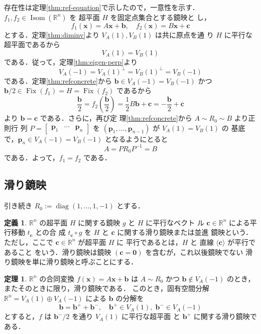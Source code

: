 \documentclass[11pt, uplatex, dvipdfmx, titlepage]{jsarticle}
\makeatletter
\DeclareMathOperator{\Isom}{Isom}
\DeclareMathOperator{\Fix}{Fix}
\DeclareMathOperator{\diag}{diag}
\renewenvironment{proof}[1][\proofname]{\par
  \pushQED{\qed}%
  \normalfont \topsep6\p@\@plus6\p@\relax
  \trivlist
  \item[\hskip\labelsep
         \bfseries
    {#1}]\ignorespaces
}{%
  \popQED\endtrivlist\@endpefalse
}
\theoremstyle{definition}
\newtheorem{theorem}{定理}[section]
\newtheorem*{definition}{定義}
\renewcommand{\proofname}{\textbf{証明}}
\makeatother
\begin{document}
\begin{proof}
  
  存在性は定理\ref{thm:ref-equation}で示したので，一意性を示す．$f_1,
  f_2 \in \Isom(\mathbb{R}^n)$ を 超平面 $H$ を固定点集合とする鏡映と
  し，
  \[
    f_1(\bm{x}) = A\bm{x} + \bm{b}, \quad f_2(\bm{x}) = B\bm{x} + \bm{c}
  \]
  とする．定理\ref{thm:diminv}より $V_A(1), V_B(1)$ は共に原点を通
  り $H$ に平行な超平面であるから
  \[
    V_A(1) = V_B(1)
  \]
  である．従って，定理\ref{thm:eigen-perp}より
  \[
    V_A(-1) = V_A(1)^{\perp} = V_B(1)^{\perp} = V_B(-1)
  \]
  である．定理\ref{thm:refconcrete}から $\bm{b} \in
  V_A(-1) = V_B(-1)$ かつ $\bm{b}/2 \in \Fix(f_1) = H = \Fix(f_2)$ であるから
  \[
    \frac{\bm{b}}{2} = f_2\left( \frac{\bm{b}}{2}\right) = \frac{1}{2} B \bm{b} + \bm{c} 
    = -\frac{\bm{b}}{2} + \bm{c} 
  \]
  より $\bm{b} = \bm{c}$ である．さらに，再び定
  理\ref{thm:refconcrete}から $A \sim R_0 \sim B$ より正則行
  列 $P=\left[
    \begin{array}{ccc}
      \bm{p}_1 & \cdots & \bm{p}_n
    \end{array}
  \right]$ を $(\bm{p}_1, \ldots, \bm{p}_{n-1})$ が $V_A(1)=V_B(1)$ の
  基底で，$\bm{p}_n \in V_A(-1)=V_B(-1)$ となるようにとると
  \[
    A= P R_0 P^{-1}  = B
  \]
  である．よって，$f_1 = f_2$ である．
\end{proof}

\subsection{滑り鏡映}\label{sec:glide}

引き続き $R_0:=\diag(1,\ldots, 1,-1)$ とする．

\begin{definition}
  $\mathbb{R}^n$ の超平面 $H$ に関する鏡映 $g$ と $H$ に平行なベクト
  ル $\bm{c} \in \mathbb{R}^n$ による平行移動 $t_{\bm{c}}$ との合
  成 $t_{\bm{c}} \circ g$ を $H$ と $\bm{c}$ に関する滑り鏡映または並進
  鏡映という．ただし，ここで $\bm{c} \in \mathbb{R}^n$ が超平面 $H$ に
  平行であるとは，$H$ と 直線 $\langle \bm{c} \rangle$ が平行であること
  をいう．滑り鏡映は鏡映 $(\bm{c}=\bm{0})$ を含むが，これ以後鏡映でない
  滑り鏡映を単に滑り鏡映と呼ぶことにする．
\end{definition}


\begin{theorem}\label{thm:glide}
  $\mathbb{R}^n$ の合同変換 $f(\bm{x}) = A\bm{x} + \bm{b}$ は $A \sim R_0$ かつ
  $\bm{b} \notin V_A(-1)$ のとき，またそのときに限り，滑り鏡映である．
  このとき，固有空間分解 $\mathbb{R}^n = V_A(1) \oplus V_A(-1)$ による $\bm{b}$ の分解を
  \begin{equation}\label{eq:eigendecomp-gen}
    \bm{b} = \bm{b}^{+} + \bm{b}^{-}, \quad \bm{b}^{+} \in V_A(1), \; \bm{b}^{-} \in V_A(-1)
  \end{equation}
  とすると，$f$ は $\bm{b}^{-}/2$ を通り $V_A(1)$ に平行な超平面
  と $\bm{b}^{+}$ に関する滑り鏡映である．
\end{theorem}
\end{document}
